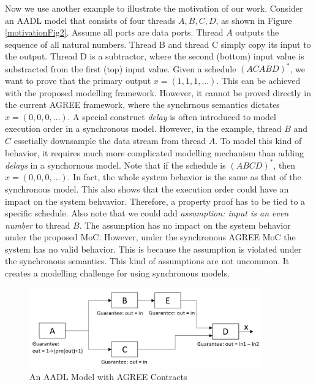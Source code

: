 Now we use another example to illustrate the motivation of our work.
Consider an AADL model that consists of four threads $A, B, C, D$, as shown in Figure \ref{motivationFig2}. Assume all ports are data ports. Thread $A$ outputs the sequence of all natural numbers. Thread B and thread C simply copy its input to the output. Thread D is a subtractor, where the second (bottom) input value is substracted from the first (top) input value. Given a schedule $(ACABD)^*$, we want to prove that the primary output $x = (1,1,1,...)$. This can be achieved with the proposed modelling framework. However, it cannot be proved directly in the current AGREE framework, where the synchrnous semantics dictates $x= (0,0,0,...)$. A special construct \emph{delay} is often introduced to model execution order in a synchronous model. However, in the example, thread $B$ and $C$ essetially downsample the data stream from thread $A$. To model this kind of behavior, it requires much more complicated modelling mechanism than adding \emph{delays} in a synchornous model. 
Note that if the schedule is $(ABCD)^*$, then $x=(0,0,0,...)$. In fact, the whole system behavior is the same as that of the synchronous model. This also shows that the execution order could have an impact on the system behvavior. Therefore, a property proof has to be tied to a specific schedule.
Also note that we could add \emph{assumption: input is an even number} to thread $B$. The assumption has no impact on the system behavior under the proposed MoC. However, under the synchronous AGREE MoC the system has no valid behavior. This is because the assumption is violated under the synchronous semantics. This kind of assumptions are not uncommon. It creates a modelling challenge for using synchronous models. 

\begin{figure}[ht!]
\centering
\includegraphics[width=100mm]{MotivationalExample2.jpg}
\caption{An AADL Model with AGREE Contracts\label{motivation1}}
\end{figure}
